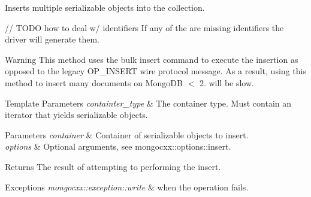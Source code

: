 Inserts multiple serializable objects into the collection. 

// T\+O\+DO how to deal w/ identifiers If any of the are missing identifiers the driver will generate them.

\begin{DoxyWarning}{Warning}
This method uses the bulk insert command to execute the insertion as opposed to the legacy O\+P\+\_\+\+I\+N\+S\+E\+RT wire protocol message. As a result, using this method to insert many documents on Mongo\+DB $<$ 2. will be slow. 
\end{DoxyWarning}

\begin{DoxyTemplParams}{Template Parameters}
{\em containter\+\_\+type} & The container type. Must contain an iterator that yields serializable objects.\\
\hline
\end{DoxyTemplParams}

\begin{DoxyParams}{Parameters}
{\em container} & Container of serializable objects to insert. \\
\hline
{\em options} & Optional arguments, see mongocxx\+::options\+::insert.\\
\hline
\end{DoxyParams}
\begin{DoxyReturn}{Returns}
The result of attempting to performing the insert. 
\end{DoxyReturn}

\begin{DoxyExceptions}{Exceptions}
{\em mongocxx\+::exception\+::write} & when the operation fails. \\
\hline
\end{DoxyExceptions}
